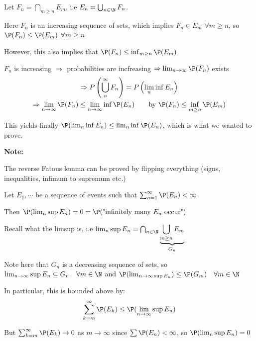 \par\bigskip
\begin{prf}{}
  Let $F_n = \bigcap_{m\geq n}E_m$, i.e $E_n = \bigcup_{n\in\N}F_n$.\par
  \noindent Here $F_n$ is an increasing sequence of sets, which implies $F_n\in E_m$ $\forall m\geq n$, so $\P(F_n)\leq \P(E_m)$ $\forall m\geq n$\par
  \noindent However, this also implies that $\P(F_n)\leq \inf_{m\geq n}\P(E_m)$
  \par\bigskip
  \noindent $F_n$ is increasing $\Rightarrow$ probabilities are incfreasing $\Rightarrow \lim_{n\to\infty}\P(F_n)$ exists
  \begin{equation*}
    \begin{gathered}
      \Rightarrow P\left(\bigcup_{n}^{\infty}F_n\right) = P\left(\lim_{n}\inf E_n\right)\\
      \Rightarrow \lim_{n\to\infty}\P(F_n)\leq \lim_{n\to\infty}\inf\P(E_n)\qquad\text{by } \P(F_n)\leq \inf_{m\geq n}\P(E_m)
    \end{gathered}
  \end{equation*}
  \par\bigskip
  \noindent This yields finally $\P(\lim_{n}\inf E_n)\leq \lim_{n}\inf \P(E_n)$, which is what we wanted to prove.
\end{prf}
\par\bigskip
\noindent\textbf{Note:}\par
\noindent The reverse Fatous lemma can be proved by flipping everything (signs, inequalities, infimum to supremum etc.)
\par\bigskip
\begin{lem}{}
  Let $E_1,\cdots$ be a sequence of events such that $\sum_{n=1}^{\infty}\P(E_n)<\infty$
  \par\bigskip
  \noindent Then $\P(\lim_{n}\sup E_n) = 0 = \P(\text{"infinitely many $E_n$ occur"})$
\end{lem}
\newpage
\begin{prf}{}
  Recall what the limsup is, i.e $\lim_{n}\sup E_n = \bigcap_{n\in\N}\underbrace{\bigcup_{m\geq n} E_ m}_{G_n}$
  \par\bigskip
  \noindent Note here that $G_n$ is a decreasing sequence of sets, so $\lim_{n\to\infty}\sup E_n\subseteq G_n\quad\forall m\in \N$ and $\P(\lim_{n\to\infty\sup E_n})\leq \P(G_m)\quad\forall m\in\N$
  \par\bigskip
  \noindent In particular, this is bounded above by:
  \begin{equation*}
    \begin{gathered}
      \sum_{k=m}^{\infty}\P(E_k)\leq \P(\lim_{n\to\infty}\sup E_n)
    \end{gathered}
  \end{equation*}\par
  \noindent But $\sum_{k=m}^{\infty}\P(E_k)\to0$ as $m\to\infty$ since $\sum\P(E_n)<\infty$, so $\P(\lim_{n}\sup E_n) = 0$
\end{prf}
